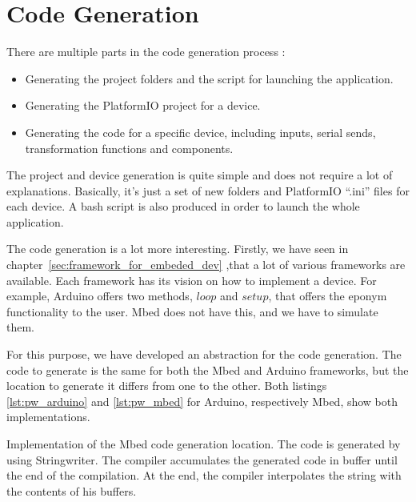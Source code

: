 \section{Code Generation}
\label{sec:code_generation}

There are multiple parts in the code generation process :
\begin{itemize}
\item Generating the project folders and the script for launching the application.
\item Generating the PlatformIO project for a device.
\item Generating the code for a specific device, including inputs, serial
  sends, transformation functions and components.
\end{itemize}

The project and device generation is quite simple and does not require a lot of
explanations. Basically, it's just a set of new folders and PlatformIO ``.ini''
files for each device. A bash script is also produced in order to launch the
whole application.

The code generation is a lot more interesting. Firstly, we have seen in
chapter~\ref{sec:framework_for_embeded_dev} ,that a lot of various
frameworks are available. Each framework has its vision on how to implement a device. For
example, Arduino offers two methods, $loop$ and $setup$, that offers the eponym
functionality to the user. Mbed does not have this, and we have to simulate them.

For this purpose, we have developed an abstraction for the code generation. The
code to generate is the same for both the Mbed and Arduino frameworks, but the
location to generate it differs from one to the other. Both listings
\ref{lst:pw_arduino} and \ref{lst:pw_mbed} for Arduino, respectively Mbed,
show both implementations.

\begin{listing}[!htbp]
  \centering
\begin{scalacode}
override def close(): Unit = {
    pw.append {
      s"""
         |#include <stdbool.h>
         |${if (generateTimer) s"""#include "Timer.h""""}
         |
         |${if (generateTimer) s"Timer t;"}
         |
         |// Global definition
         |${global.toString}
         |
         |// Function definition
         |${function.toString}
         |
         |void loop() {
         |  ${if (generateTimer) s"t.update();"}
         |  ${loop.toString}
         |}
         |
         |void setup() {
         |  ${if (generateSerial) s"Serial.begin(9600);"}
         |  ${setup.toString}
         |}
         |
       """.stripMargin
    }
    pw.flush()
    pw.close()
    formatSource()
  }
}
\end{scalacode}
  \caption[Implementation of the code generation location for
Arduino]{Implementation of the Mbed code generation location. The code is
generated by using Stringwriter. The compiler accumulates the generated code in
buffer until the end of the compilation. At the end, the compiler interpolates
the string with the contents of his buffers.}
\label{lst:pw_arduino}
\end{listing}

